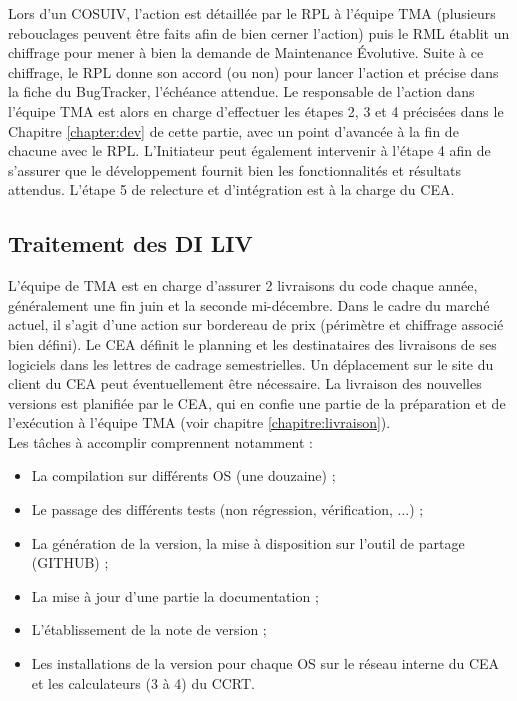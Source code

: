 Lors d'un COSUIV, l'action est détaillée par le RPL à l'équipe TMA (plusieurs rebouclages peuvent être faits afin de bien cerner l'action) puis le RML établit un chiffrage pour mener à bien la demande de Maintenance Évolutive. Suite à ce chiffrage, le RPL donne son accord (ou non) pour lancer l'action et précise dans la fiche du BugTracker, l'échéance attendue. Le responsable de l'action dans l'équipe TMA est alors en charge d'effectuer les étapes 2, 3 et 4 précisées dans le Chapitre \ref{chapter:dev} de cette partie, avec un point d'avancée à la fin de chacune avec le RPL. L'Initiateur peut également intervenir à l'étape 4 afin de s'assurer que le développement fournit bien les fonctionnalités et résultats attendus. L'étape 5 de relecture et d'intégration est à la charge du CEA. \\

\subsection{Traitement des DI LIV}
L'équipe de TMA est en charge d'assurer 2 livraisons du code chaque année, généralement une fin juin et la seconde mi-décembre. Dans le cadre du marché actuel, il s'agit d'une action sur bordereau de prix (périmètre et chiffrage associé bien défini). Le CEA définit le planning et les destinataires des livraisons de ses logiciels dans les lettres de cadrage semestrielles. Un déplacement sur le site du client du CEA peut éventuellement être nécessaire. 
La livraison des nouvelles versions est planifi\'ee par le CEA, qui en confie une partie de la pr\'eparation et de l'ex\'ecution \`a l'\'equipe TMA (voir chapitre \ref{chapitre:livraison}).\\

Les t\^aches \`a accomplir comprennent notamment :
\begin{itemize}
    \item La compilation sur diff\'erents OS (une douzaine) ;
    \item Le passage des diff\'erents tests (non r\'egression, v\'erification, ...) ;
    \item La g\'en\'eration de la version, la mise à disposition sur l'outil de partage (GITHUB) ;
    \item La mise \`a jour d'une partie la documentation ; 
    \item L'\'etablissement de la note de version ;
    \item Les installations de la version pour chaque OS sur le r\'eseau interne du CEA et les calculateurs (3 \`a 4) du CCRT.
\end{itemize}


